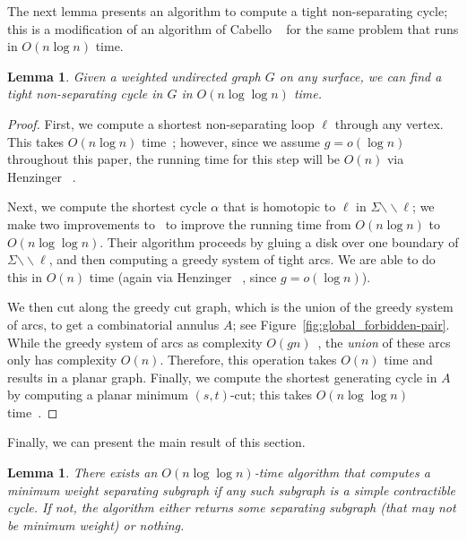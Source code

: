 \documentclass[11pt,twoside]{article}
\def\snip{\mathbin{\raisebox{0.15ex}{\rotatebox[origin=c]{60}{\Rightscissors}\!}}}
\def\snip{\mathbin{\backslash\!\!\backslash}}
\newtheorem{lemma}[theorem]{Lemma}
\begin{document}
{\color{Black}

The next lemma presents an algorithm to compute a tight non-separating cycle; this is a modification of an algorithm of Cabello \etal~\cite[Theorem 5.4]{cdem-fotc-10} for the same problem that runs in $O(n \log n)$ time.

\begin{lemma}
\label{lem:tightcycle}
Given a weighted undirected graph $G$ on any surface, we can find a tight non-separating cycle in $G$ in $O(n\log\log n)$ time.
\end{lemma}

\begin{proof}
First, we compute a shortest non-separating loop $\ell$ through any vertex.  This takes $O(n\log n)$ time~\cite{eh-ocsd-04}; however, since we assume $g = o(\log n)$ throughout this paper, the running time for this step will be $O(n)$ via Henzinger \etal~\cite{hkrs-fspap-97}.

Next, we compute the shortest cycle $\alpha$ that is homotopic to $\ell$ in $\Sigma\snip\ell$; we make two improvements to~\cite[Lemma 4.1]{cdem-fotc-10} to improve the running time from $O(n \log n)$ to $O(n \log \log n)$.  Their algorithm proceeds by gluing a disk over one boundary of $\Sigma\snip\ell$, and then computing a greedy system of tight arcs.  We are able to do this in $O(n)$ time (again via Henzinger \etal~\cite{hkrs-fspap-97}, since $g = o(\log n)$). 

We then cut along the greedy cut graph, which is the union of the greedy system of arcs, to get a combinatorial annulus $A$; see Figure~\ref{fig:global_forbidden-pair}. While the greedy system of arcs as complexity $O(gn)$~\cite{cdem-fotc-10}, the \emph{union} of these arcs only has complexity $O(n)$.  Therefore, this operation takes $O(n)$ time and results in a planar graph.  Finally, we compute the shortest generating cycle in $A$ by computing a planar minimum $(s,t)$-cut; this takes $O(n \log \log n)$ time~\cite{insw-iamcmf-11}.
\end{proof}


Finally, we can present the main result of this section.
\begin{lemma}
\label{lem:contractible-alg}
There exists an $O(n \log \log n)$-time algorithm that computes a minimum weight separating subgraph if any such subgraph is a simple contractible cycle. If not, the algorithm either returns some separating subgraph (that may not be minimum weight) or nothing.
\end{lemma}


}
\end{document}
